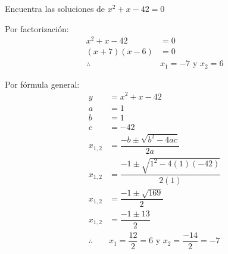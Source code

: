 Encuentra las soluciones de $x^2+x-42=0$

\begin{solutionbox}{12cm}
    \begin{multicols}{2}
        Por factorización:
        \begin{align*}
            x^2+x-42   & = 0                       \\
            (x+7)(x-6) & = 0                       \\
            \therefore & x_1 =-7 \text{ y } x_2 =6
        \end{align*}

        \columnbreak

        Por fórmula general:
        \begin{align*}
            y          & =	      x^2+x-42
            \\
            a          & =1
            \\
            b          & =1
            \\
            c          & =-42
            \\
            x_{1,2}    & = \dfrac{-b\pm\sqrt{b^2-4ac}}{2a}
            \\[2em]
            x_{1,2}    & = \dfrac{-1\pm\sqrt{1^2-4(1)(-42)}}{2(1)}
            \\[2em]
            x_{1,2}    & = \dfrac{-1\pm\sqrt{169}}{2}
            \\[2em]
            x_{1,2}    & = \dfrac{-1\pm 13}{2}
            \\[2em]
            \therefore & x_1 =\dfrac{12}{2}=6 \text{ y }  x_2
            =\dfrac{-14}{2}=-7                                     \\[2em]
        \end{align*}
    \end{multicols}
\end{solutionbox}